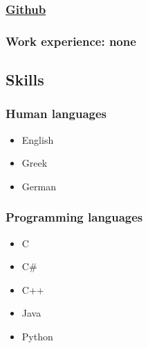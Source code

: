 \documentclass[]{article}
\providecommand{\tightlist}{%
  \setlength{\itemsep}{0pt}\setlength{\parskip}{0pt}}
\begin{document}
\hypertarget{github}{%
\subsubsection{\texorpdfstring{\href{https://github.com/DimitrisGrigoropoulosP2016099}{Github}}{Github}}\label{github}}

\hypertarget{work-experience-none}{%
\subsubsection{Work experience: none}\label{work-experience-none}}

\hypertarget{skills}{%
\subsection{\texorpdfstring{{Skills}}{Skills}}\label{skills}}

\hypertarget{human-languages}{%
\subsubsection{Human languages}\label{human-languages}}

\begin{itemize}
\tightlist
\item
  English
\item
  Greek
\item
  German
\end{itemize}

\hypertarget{programming-languages}{%
\subsubsection{Programming languages}\label{programming-languages}}

\begin{itemize}
\tightlist
\item
  C
\item
  C\#
\item
  C++
\item
  Java
\item
  Python
\end{itemize}
\end{document}
